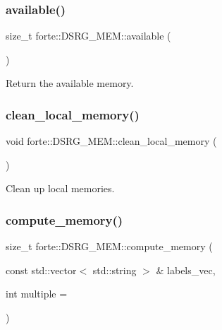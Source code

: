 \subsubsection{\texorpdfstring{available()}{available()}}
{\footnotesize\ttfamily size\+\_\+t forte\+::\+D\+S\+R\+G\+\_\+\+M\+E\+M\+::available (\begin{DoxyParamCaption}{ }\end{DoxyParamCaption})\hspace{0.3cm}{\ttfamily [inline]}}



Return the available memory. 

\mbox{\label{classforte_1_1_d_s_r_g___m_e_m_afe7b7579d767ee201146458caefcd944}} 
\subsubsection{\texorpdfstring{clean\+\_\+local\+\_\+memory()}{clean\_local\_memory()}}
{\footnotesize\ttfamily void forte\+::\+D\+S\+R\+G\+\_\+\+M\+E\+M\+::clean\+\_\+local\+\_\+memory (\begin{DoxyParamCaption}{ }\end{DoxyParamCaption})\hspace{0.3cm}{\ttfamily [inline]}}



Clean up local memories. 

\mbox{\label{classforte_1_1_d_s_r_g___m_e_m_a43e1ba53bcac873bcec050cf7676751d}} 
\subsubsection{\texorpdfstring{compute\+\_\+memory()}{compute\_memory()}}
{\footnotesize\ttfamily size\+\_\+t forte\+::\+D\+S\+R\+G\+\_\+\+M\+E\+M\+::compute\+\_\+memory (\begin{DoxyParamCaption}\item[{const std\+::vector$<$ std\+::string $>$ \&}]{labels\+\_\+vec,  }\item[{int}]{multiple = {} }\end{DoxyParamCaption})}



